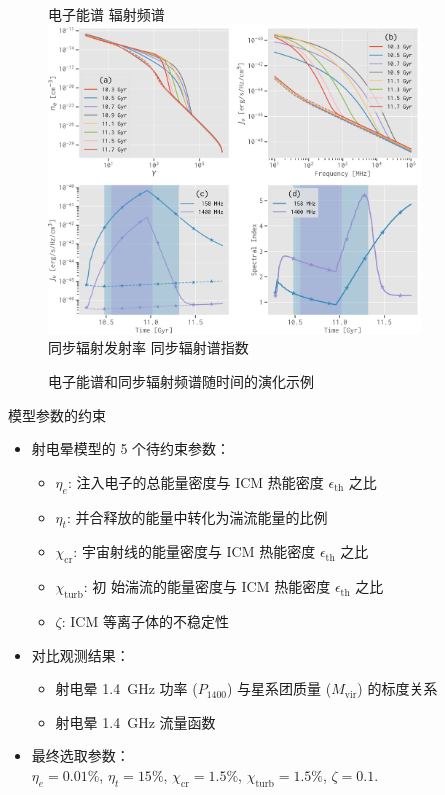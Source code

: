 \documentclass{beamer}
\newcommand{\R}[1]{\text{#1}}  %
\begin{document}
\begin{frame}
  \begin{figure}
    \centering\footnotesize
    电子能谱 \hspace{8em} 辐射频谱 \\
    \includegraphics[width=0.88\textwidth]{spec-evo-example} \\
    同步辐射发射率 \hspace{6em} 同步辐射谱指数
    \caption{电子能谱和同步辐射频谱随时间的演化示例}
  \end{figure}
\end{frame}

\begin{frame}{模型参数的约束}
  \begin{itemize}
    \item 射电晕模型的 5 个待约束参数：
      \begin{itemize}
        \item $\eta_e$:
          注入电子的总能量密度与 ICM 热能密度 $\epsilon_{\R{th}}$ 之比
        \item $\eta_t$:
          并合释放的能量中转化为湍流能量的比例
        \item $\chi_{\R{cr}}$:
          宇宙射线的能量密度与 ICM 热能密度 $\epsilon_{\R{th}}$ 之比
        \item $\chi_{\R{turb}}$:
          初  始湍流的能量密度与 ICM 热能密度 $\epsilon_{\R{th}}$ 之比
        \item $\zeta$:
          ICM 等离子体的不稳定性
      \end{itemize}
    \item 对比观测结果：
      \begin{itemize}
        \item 射电晕 \SI{1.4}{\GHz} 功率 ($P_{1400}$)
          与星系团质量 ($M_{\R{vir}}$) 的标度关系
        \item 射电晕 \SI{1.4}{\GHz} 流量函数
      \end{itemize}
    \item 最终选取参数：\\
      $\eta_e = 0.01\%$,
      $\eta_t = 15\%$,
      $\chi_{\R{cr}} = 1.5\%$,
      $\chi_{\R{turb}} = 1.5\%$,
      $\zeta = 0.1$.
  \end{itemize}
\end{frame}
\end{document}
